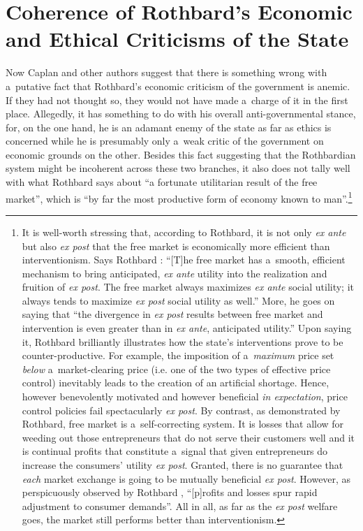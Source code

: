 \section{Coherence of Rothbard's Economic and Ethical Criticisms of the State}

Now Caplan and other authors suggest that there is something wrong with a~putative fact that Rothbard's economic criticism of the government is anemic. If they had not thought so, they would not have made a~charge of it in the first place. Allegedly, it has something to do with his overall anti-governmental stance, for, on the one hand, he is an adamant enemy of the state as far as ethics is concerned while he is presumably only a~weak critic of the government on economic grounds on the other. Besides this fact suggesting that the Rothbardian system might be incoherent across these two branches, it also does not tally well with what Rothbard says about ``a fortunate utilitarian result of the free market'', which is ``by far the most productive form of economy known to man''.\footnote{It is well-worth stressing that, according to Rothbard, it is not only \textit{ex ante} but also \textit{ex post} that the free market is economically more efficient than interventionism. Says Rothbard 
\parencite*[][p.891]{rothbard_man_2009}: %
 ``[T]he free market has a~smooth, efficient mechanism to bring anticipated, \textit{ex ante} utility into the realization and fruition of \textit{ex post}. The free market always maximizes \textit{ex ante} social utility; it always tends to maximize \textit{ex post} social utility as well.'' More, he goes on saying that ``the divergence in \textit{ex post} results between free market and intervention is even greater than in \textit{ex ante}, anticipated utility.'' Upon saying it, Rothbard brilliantly illustrates how the state's interventions prove to be counter-productive. For example, the imposition of a~\textit{maximum} price set \textit{below} a~market-clearing price (i.e. one of the two types of effective price control) inevitably leads to the creation of an artificial shortage. Hence, however benevolently motivated and however beneficial \textit{in expectation}, price control policies fail spectacularly \textit{ex post}. By contrast, as demonstrated by Rothbard, free market is a~self-correcting system. It is losses that allow for weeding out those entrepreneurs that do not serve their customers well and it is continual profits that constitute a~signal that given entrepreneurs do increase the consumers' utility \textit{ex post}. Granted, there is no guarantee that \textit{each} market exchange is going to be mutually beneficial \textit{ex post}. However, as perspicuously observed by Rothbard 
\parencite*[][p.885]{rothbard_man_2009}, %
 ``[p]rofits and losses spur rapid adjustment to consumer demands''. All in all, as far as the \textit{ex post} welfare goes, the market still performs better than interventionism. } 
\parencite[][p.48]{rothbard_for_2006}%





